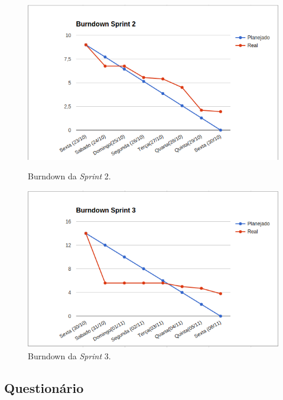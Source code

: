 	\begin{figure}[!h]
	\begin{minipage}[b]{0.5\linewidth}
	\centering
	\includegraphics[scale=0.5]{figuras/burndown_sprint2.png}
	\caption{Burndown da \textit{Sprint} 2.}
	\label{fig:burndown2}
	\end{minipage}
	\hspace{0.5cm}
	\begin{minipage}[b]{0.5\linewidth}
	\centering
	\includegraphics[scale=0.5]{figuras/burndown_sprint3.png}
	\caption{Burndown da \textit{Sprint} 3.}
	\label{fig:burndown3}
	\end{minipage}
	\end{figure}

	\vfill
	\pagebreak

	\subsection{Questionário}

